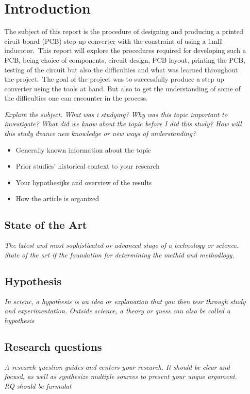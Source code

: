 
\section{Introduction}
The subject of this report is the procedure of designing and producing a printed ciruit board (PCB) step up converter with the constraint of using a 1mH inducotor.\
This report will explore the procedures required for developing such a PCB, being choice of components, circuit design, PCB layout, printing the PCB, testing of the circuit but also the difficulties and what was learned throughout the project.\ 
The goal of the project was to successfully produce a step up converter using the tools at hand. But also to get the understanding of some of the difficulties one can encounter in the process.\


\textit{Explain the subject. What was i studying? Why was this topic important to investigate? What did we know about the topic before I did this study? How will this study dvance new knowledge or new ways of understanding?}
\begin{itemize}
    \item Generally known information about the topic
    \item Prior studies' historical context to your research
    \item Your hypothesijks and overview of the results
    \item How the article is organized
\end{itemize}
\subsection{State of the Art}
\textit{The latest and most sophisticated or advanced stage of a technology or science. State of the art if the foundation for determining the methid and methodlogy.}
\subsection{Hypothesis}
\textit{In scienc, a hypothesis is an idea or explanation that you then tesr through study and experimentation. Outside science, a theory or quess can also be called a hypothesis}
\subsection{Research questions}
\textit{A research question guides and centers your research. It should be clear and focusd, as well as synthesize multiple sources to present your unque argument. RQ should be furmulat}
